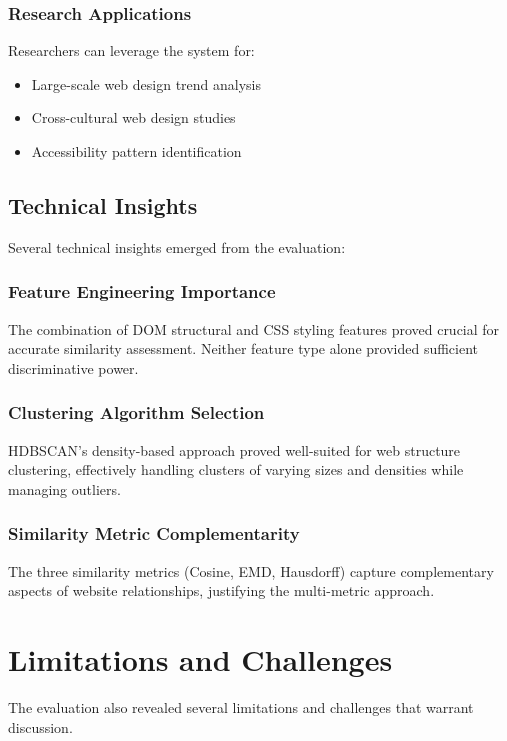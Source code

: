 \subsubsection{Research Applications}
Researchers can leverage the system for:
\begin{itemize}
    \item Large-scale web design trend analysis
    \item Cross-cultural web design studies
    \item Accessibility pattern identification
\end{itemize}

\subsection{Technical Insights}
\label{subsec:technical-insights}

Several technical insights emerged from the evaluation:

\subsubsection{Feature Engineering Importance}
The combination of DOM structural and CSS styling features proved crucial for accurate similarity assessment. Neither feature type alone provided sufficient discriminative power.

\subsubsection{Clustering Algorithm Selection}
HDBSCAN's density-based approach proved well-suited for web structure clustering, effectively handling clusters of varying sizes and densities while managing outliers.

\subsubsection{Similarity Metric Complementarity}
The three similarity metrics (Cosine, EMD, Hausdorff) capture complementary aspects of website relationships, justifying the multi-metric approach.

\section{Limitations and Challenges}
\label{sec:limitations-discussion}

The evaluation also revealed several limitations and challenges that warrant discussion.

